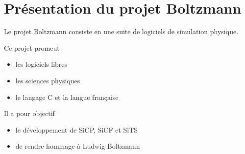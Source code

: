 %

\section{Présentation du projet Boltzmann}
%
Le projet Boltzmann consiste en une suite de logiciels de simulation physique. 

Ce projet promeut
\begin{itemize}[leftmargin=2cm, label=, itemsep=0pt]%
\item les logiciels libres
\item les sciences physiques
\item le langage C et la langue française
\end{itemize}

Il a pour objectif
\begin{itemize}[leftmargin=2cm, label=, itemsep=0pt]%
\item le développement de SiCP, SiCF et SiTS
\item de rendre hommage à Ludwig Boltzmann
\end{itemize}
